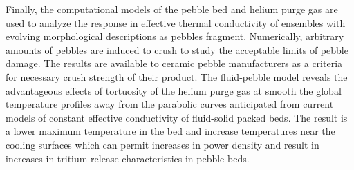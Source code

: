 Finally, the computational models of the pebble bed and helium purge gas are used to analyze the response in effective thermal conductivity of ensembles with evolving morphological descriptions as pebbles fragment. Numerically, arbitrary amounts of pebbles are induced to crush to study the acceptable limits of pebble damage. The results are available to ceramic pebble manufacturers as a criteria for necessary crush strength of their product. The fluid-pebble model reveals the advantageous effects of tortuosity of the helium purge gas at smooth the global temperature profiles away from the parabolic curves anticipated from current models of constant effective conductivity of fluid-solid packed beds. The result is a lower maximum temperature in the bed and increase temperatures near the cooling surfaces which can permit increases in power density and result in increases in tritium release characteristics in pebble beds.